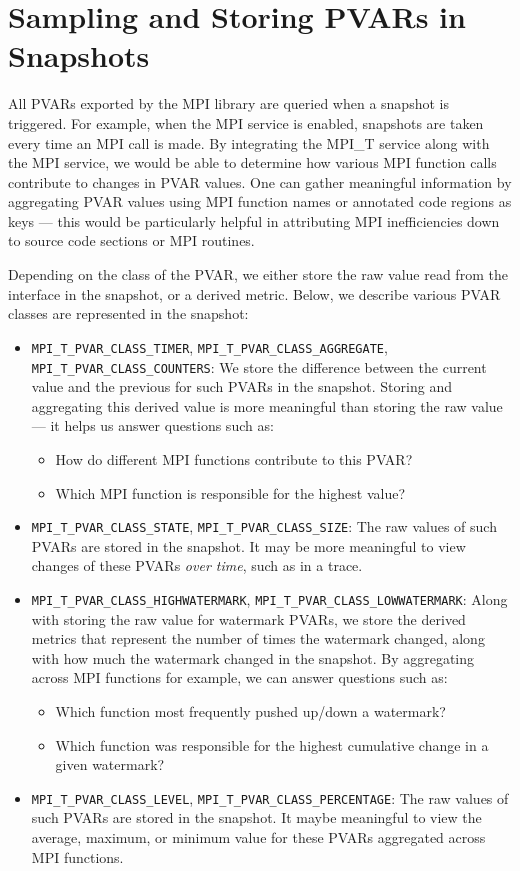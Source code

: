 \section{Sampling and Storing PVARs in Snapshots}
All PVARs exported by the MPI library are queried when a snapshot is triggered. For example, when the MPI service is enabled, snapshots are taken every time an MPI call is made. By integrating the MPI\_T service along with the MPI service, we would be able to determine how various MPI function calls contribute to changes in PVAR values. One can gather meaningful information by aggregating PVAR values using MPI function names or annotated code regions as keys --- this would be particularly helpful in attributing MPI inefficiencies down to source code sections or MPI routines. 
\par Depending on the class of the PVAR, we either store the raw value read from the interface in the snapshot, or a derived metric. Below, we describe various PVAR classes are represented in the snapshot:
\begin{itemize}
	\item \verb+MPI_T_PVAR_CLASS_TIMER+, \verb+MPI_T_PVAR_CLASS_AGGREGATE+, \verb+MPI_T_PVAR_CLASS_COUNTERS+: We store the difference between the current value and the previous for such PVARs in the snapshot. Storing and aggregating this derived value is more meaningful than storing the raw value --- it helps us answer questions such as: 
 \begin{itemize}
   \item How do different MPI functions contribute to this PVAR? 
   \item Which MPI function is responsible for the highest value?
 \end{itemize}
	\item \verb+MPI_T_PVAR_CLASS_STATE+, \verb+MPI_T_PVAR_CLASS_SIZE+: The raw values of such PVARs are stored in the snapshot. It may be more meaningful to view changes of these PVARs \emph{over time}, such as in a trace.
	\item \verb+MPI_T_PVAR_CLASS_HIGHWATERMARK+, \verb+MPI_T_PVAR_CLASS_LOWWATERMARK+: Along with storing the raw value for watermark PVARs, we store the derived metrics that represent the number of times the watermark changed, along with how much the watermark changed in the snapshot. By aggregating across MPI functions for example, we can answer questions such as: 
 \begin{itemize}
   \item Which function most frequently pushed up/down a watermark? 
   \item Which function was responsible for the highest cumulative change in a given watermark?
 \end{itemize}
 \item \verb+MPI_T_PVAR_CLASS_LEVEL+, \verb+MPI_T_PVAR_CLASS_PERCENTAGE+: The raw values of such PVARs are stored in the snapshot. It maybe meaningful to view the average, maximum, or minimum value for these PVARs aggregated across MPI functions.
\end{itemize}

